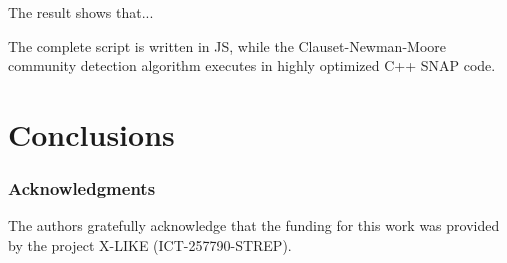 \documentclass{article} %
\begin{document}
The result shows that...

The complete script is written in JS, while the Clauset-Newman-Moore community detection algorithm \cite{clauset-newman-moore} executes in highly optimized C++ SNAP code.

\section{Conclusions}



\subsubsection*{Acknowledgments}
The authors gratefully acknowledge that the funding for this work was provided by the project X-LIKE (ICT-257790-STREP)\cite{xlike}.





\end{document}
